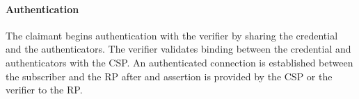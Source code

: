 \paragraph{Authentication}

The claimant begins authentication with the verifier by sharing the credential and the authenticators. The verifier validates binding between the credential and authenticators with the CSP.
An authenticated connection is established between the subscriber and the RP after and assertion is provided by the CSP or the verifier to the RP.

%
%
%
%
%
%

